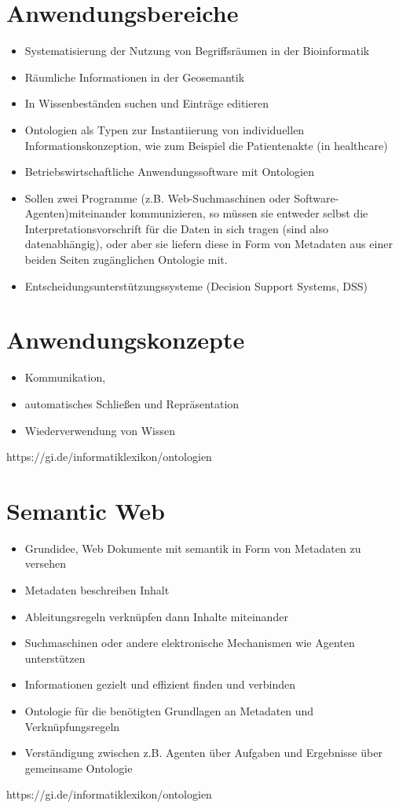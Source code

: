 \section*{Anwendungsbereiche}
\begin{itemize}
	\item Systematisierung der Nutzung von Begriffsräumen in der Bioinformatik
	\item Räumliche Informationen in der Geosemantik
	\item In Wissenbeständen suchen und Einträge editieren
	\item Ontologien als Typen zur Instantiierung von individuellen Informationskonzeption, wie zum Beispiel die Patientenakte (in healthcare)
	\item Betriebswirtschaftliche Anwendungssoftware mit Ontologien
	\item Sollen zwei Programme (z.B. Web-Suchmaschinen oder Software-Agenten)miteinander kommunizieren, so müssen sie entweder selbst die Interpretationsvorschrift für die Daten in sich tragen (sind also datenabhängig), oder aber sie liefern diese in Form von Metadaten aus einer beiden Seiten zugänglichen Ontologie mit.
	\item Entscheidungsunterstützungssysteme (Decision Support Systems, DSS)
\end{itemize}

\section*{Anwendungskonzepte}
\begin{itemize}
	\item Kommunikation, 
	\item automatisches Schließen und Repräsentation 
	\item Wiederverwendung von Wissen
\end{itemize}
https://gi.de/informatiklexikon/ontologien

\section*{Semantic Web}
\begin{itemize}
	\item Grundidee, Web Dokumente mit semantik in Form von Metadaten zu versehen
	\item Metadaten beschreiben Inhalt
	\item Ableitungsregeln verknüpfen dann Inhalte miteinander
	\item Suchmaschinen oder andere elektronische Mechanismen wie Agenten unterstützen
	\item Informationen gezielt und effizient finden und verbinden
	\item Ontologie für die benötigten Grundlagen an Metadaten und Verknüpfungsregeln
	\item Verständigung zwischen z.B. Agenten über Aufgaben und Ergebnisse über gemeinsame Ontologie
\end{itemize}
https://gi.de/informatiklexikon/ontologien

